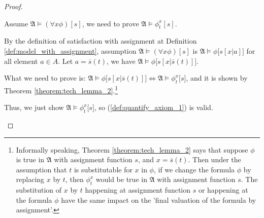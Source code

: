 \documentclass[11pt,letterpaper]{book}
\theoremstyle{definition}
\begin{document}
\begin{proof}
\begin{enumerate}
{Assume $\mathfrak{A} \models (\forall x \phi)[s] $, we need to prove
$\mathfrak{A}\models\phi_t ^{x} [s] $.

By the definition of satisfaction with assignment at Definition
\ref{def:model_with_assignment}, assumption $\mathfrak{A} \models
(\forall x \phi)[s] $ is $\mathfrak{A} \models \phi \big[s[x | a] \big]
$ for all element $a \in A$. Let $a = \overline{s} (t)$, we have
$\mathfrak{A} \models \phi \big[s[x | \overline{s} (t)] \big] $.

What we need to prove is: $\mathfrak{A} \models \phi \big[s[x |
\overline{s} (t)] \big] \iff \mathfrak{A} \models \phi_t ^x  \big[ s
\big] $, and it is shown by Theorem
\ref{theorem:tech_lemma_2}.\footnote{Informally speaking, Theorem
\ref{theorem:tech_lemma_2} says that suppose $\phi$ is true in
$\mathfrak{A}$ with assignment function $s$, and $x = \overline{s} (t)$. 
Then under the assumption that $t$ is substitutable
for $x$ in $\phi$, if we change the formula $\phi$ by replacing $x$ by
$t$, then $\phi_{t} ^x$ would be true in $\mathfrak{A}$ with assignment
function $s$. The substitution of $x$ by $t$ happening at assignment 
function $s$ or happening at the formula $\phi$ have the same impact on 
the 'final valuation of the formula by assignment'.}

Thus, we just show $\mathfrak{A} \models \phi_t ^x  \big[ s \big] $, so
(\ref{def:quantify_axiom_1}) is valid.
}
\end{enumerate}

\end{proof}
\end{document}
